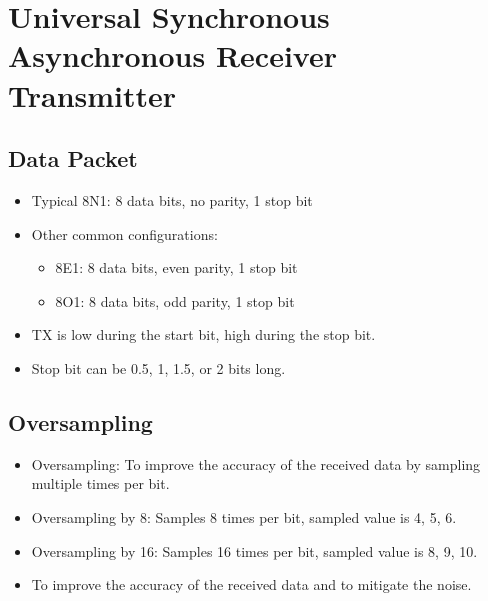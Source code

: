 \documentclass[a4paper,12pt,openany]{book}
\begin{document}
\chapter{Universal Synchronous Asynchronous Receiver Transmitter}
\section{Data Packet}
\begin{itemize}
    \item Typical 8N1: 8 data bits, no parity, 1 stop bit
    \item Other common configurations:
    \begin{itemize}
        \item 8E1: 8 data bits, even parity, 1 stop bit
        \item 8O1: 8 data bits, odd parity, 1 stop bit
    \end{itemize}
    \item TX is low during the start bit, high during the stop bit.
    \item Stop bit can be 0.5, 1, 1.5, or 2 bits long.
\end{itemize}
\section{Oversampling}
\begin{itemize}
    \item Oversampling: To improve the accuracy of the received data by sampling multiple times per bit.
    \item Oversampling by 8: Samples 8 times per bit, sampled value is 4, 5, 6.
    \item Oversampling by 16: Samples 16 times per bit, sampled value is 8, 9, 10.
    \item To improve the accuracy of the received data and to mitigate the noise.
\end{itemize}
\end{document}
